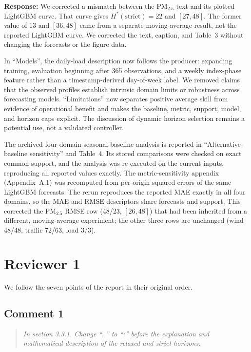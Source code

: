 \documentclass[11pt,a4paper]{article}
\let\originalsubsection\subsection
\renewcommand{\subsection}{\Needspace{9\baselineskip}\originalsubsection}
\let\originalsection\section
\renewcommand{\section}{\Needspace{12\baselineskip}\originalsection}
\newenvironment{reviewcomment}
  {\begin{quote}\itshape}
  {\end{quote}}
\newcommand{\response}{\noindent\textbf{Response:} }
\begin{document}
\response
We corrected a mismatch between the PM$_{2.5}$ text and its plotted
LightGBM curve. That curve gives $H^*(\mathrm{strict})=22$ and $[27,48]$.
The former value of 13 and $[36,48]$ came from a separate moving-average
result, not the reported LightGBM curve. We corrected the text, caption,
and Table~3 without changing the forecasts or the figure data.

In ``Models'', the daily-load description now follows the producer:
expanding training, evaluation beginning after 365 observations, and a
weekly index-phase feature rather than a timestamp-derived day-of-week
label. We removed claims that the observed profiles establish intrinsic
domain limits or robustness across forecasting models. ``Limitations''
now separates positive average skill from evidence of operational benefit
and makes the baseline, metric, support, model, and horizon caps explicit.
The discussion of dynamic horizon selection remains a potential use,
not a validated controller.

The archived four-domain seasonal-baseline analysis is reported in
``Alternative-baseline sensitivity'' and Table~4. Its stored comparisons
were checked on exact common support, and the analysis was re-executed on the
current inputs, reproducing all reported values exactly.
The metric-sensitivity appendix (Appendix~A.1) was recomputed from per-origin
squared errors of the same LightGBM forecasts. The rerun reproduces the reported
MAE exactly in all four domains, so the MAE and RMSE descriptors share forecasts
and support. This corrected the PM$_{2.5}$ RMSE row (48/23, $[26,48]$) that had
been inherited from a different, moving-average experiment; the other three rows
are unchanged (wind 48/48, traffic 72/63, load 3/3).


\section*{Reviewer 1}

We follow the seven points of the report in their original order.

\subsection*{Comment 1}

\begin{reviewcomment}
In section 3.3.1. Change ``. '' to ``:'' before the explanation and mathematical description of the relaxed and strict horizons.
\end{reviewcomment}
\end{document}
